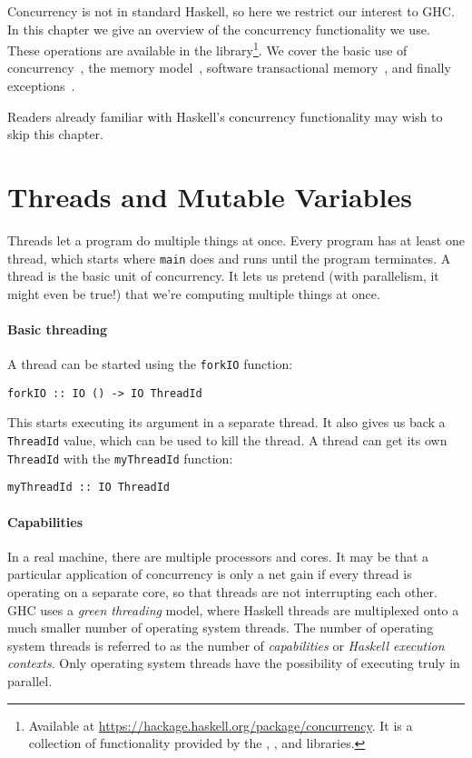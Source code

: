 Concurrency is not in standard Haskell, so here we restrict our interest to GHC.
In this chapter we give an overview of the concurrency functionality we use.
These operations are available in the
 library\footnote{Available at
\url{https://hackage.haskell.org/package/concurrency}.  It is a collection of
functionality provided by the , , and
 libraries.}.  We cover the basic use of
concurrency~, the memory
model~, software transactional
memory~, and finally
exceptions~.

Readers already familiar with Haskell's concurrency functionality may wish to
skip this chapter.

\section{Threads and Mutable Variables}
\label{sec:concurrent_haskell-threads}

Threads let a program do multiple things at once.  Every program has at least
one thread, which starts where \verb|main| does and runs until the program
terminates.  A thread is the basic unit of concurrency.  It lets us pretend
(with parallelism, it might even be true!) that we're computing multiple things
at once.

\paragraph{Basic threading}
A thread can be started using the \verb|forkIO| function:

\begin{verbatim}
forkIO :: IO () -> IO ThreadId
\end{verbatim}

This starts executing its argument in a separate thread.  It also gives us back
a \verb|ThreadId| value, which can be used to kill the thread.  A thread can get
its own \verb|ThreadId| with the \verb|myThreadId| function:

\begin{verbatim}
myThreadId :: IO ThreadId
\end{verbatim}

\paragraph{Capabilities}
In a real machine, there are multiple processors and cores.  It may be that a
particular application of concurrency is only a net gain if every thread is
operating on a separate core, so that threads are not interrupting each other.
GHC uses a \emph{green threading} model, where Haskell threads are multiplexed
onto a much smaller number of operating system threads.  The number of operating
system threads is referred to as the number of \emph{capabilities} or
\emph{Haskell execution contexts}.  Only operating system threads have the
possibility of executing truly in parallel.

